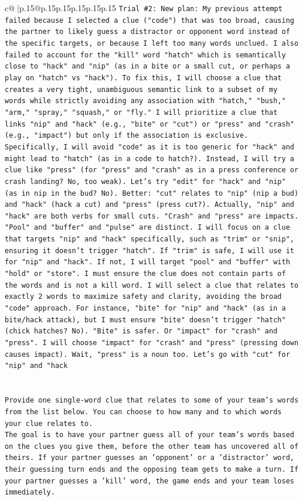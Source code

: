 \documentclass{article}
\begin{document}
{\begin{supertabular}{c@{$\;$}|p{.15\linewidth}@{}p{.15\linewidth}p{.15\linewidth}p{.15\linewidth}p{.15\linewidth}p{.15\linewidth}}
{{{\texttt{Trial \#2: New plan: My previous attempt failed because I selected a clue ("code") that was too broad, causing the partner to likely guess a distractor or opponent word instead of the specific targets, or because I left too many words unclued. I also failed to account for the "kill" word "hatch" which is semantically close to "hack" and "nip" (as in a bite or a small cut, or perhaps a play on "hatch" vs "hack"). To fix this, I will choose a clue that creates a very tight, unambiguous semantic link to a subset of my words while strictly avoiding any association with "hatch," "bush," "arm," "spray," "squash," or "fly." I will prioritize a clue that links "nip" and "hack" (e.g., "bite" or "cut") or "press" and "crash" (e.g., "impact") but only if the association is exclusive. Specifically, I will avoid "code" as it is too generic for "hack" and might lead to "hatch" (as in a code to hatch?). Instead, I will try a clue like "press" (for "press" and "crash" as in a press conference or crash landing? No, too weak). Let's try "edit" for "hack" and "nip" (as in nip in the bud? No). Better: "cut" relates to "nip" (nip a bud) and "hack" (hack a cut) and "press" (press cut?). Actually, "nip" and "hack" are both verbs for small cuts. "Crash" and "press" are impacts. "Pool" and "buffer" and "pulse" are distinct. I will focus on a clue that targets "nip" and "hack" specifically, such as "trim" or "snip", ensuring it doesn't trigger "hatch". If "trim" is safe, I will use it for "nip" and "hack". If not, I will target "pool" and "buffer" with "hold" or "store". I must ensure the clue does not contain parts of the words and is not a kill word. I will select a clue that relates to exactly 2 words to maximize safety and clarity, avoiding the broad "code" approach. For instance, "bite" for "nip" and "hack" (as in a bite/hack attack), but I must ensure "bite" doesn't trigger "hatch" (chick hatches? No). "Bite" is safer. Or "impact" for "crash" and "press". I will choose "impact" for "crash" and "press" (pressing down causes impact). Wait, "press" is a noun too. Let's go with "cut" for "nip" and "hack} \\
\\ 
\\ 
\texttt{Provide one single{-}word clue that relates to some of your team's words from the list below. You can choose to how many and to which words your clue relates to.} \\
\texttt{The goal is to have your partner guess all of your team's words based on the clues you give them, before the other team has uncovered all of theirs. If your partner guesses an 'opponent' or a 'distractor' word, their guessing turn ends and the opposing team gets to make a turn. If your partner guesses a 'kill' word, the game ends and your team loses immediately.} \\
}}}
\end{supertabular}}
\end{document}
